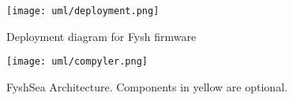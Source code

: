 \begin{figure}[h]
	\centering
	\texttt{[image: uml/deployment.png]}
	\caption{Deployment diagram for Fysh firmware}
	\label{fig:deployment}
\end{figure}

\begin{figure}[h]
	\centering
	\texttt{[image: uml/compyler.png]}
	\caption{FyshSea Architecture. Components in yellow are optional.}
	\label{fig:component}
\end{figure}


